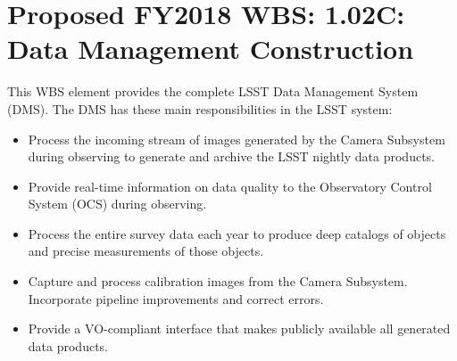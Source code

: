 \section{Proposed FY2018 WBS: 1.02C: Data Management Construction}
\label{sec:wbslist}

This WBS element provides the complete LSST Data Management System (DMS). The
DMS has these main responsibilities in the LSST system:

\begin{itemize}

  \item{Process the incoming stream of images generated by the Camera
  Subsystem during observing to generate and archive the LSST nightly data
  products.}

  \item{Provide real-time information on data quality to the Observatory
  Control System (OCS) during observing.}

  \item{Process the entire survey data each year to produce deep catalogs of
  objects and precise measurements of those objects.}

  \item{Capture and process calibration images from the Camera Subsystem.
  Incorporate pipeline improvements and correct errors.}

  \item{Provide a VO-compliant interface that makes publicly available all
  generated data products.}

\end{itemize}
